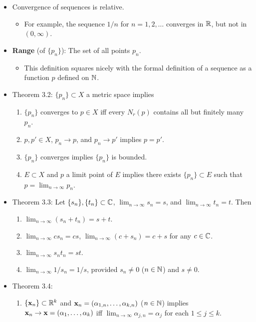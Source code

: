 \documentclass[../../notes.tex]{subfiles}
\begin{document}
\begin{itemize}
    \item {}Convergence of sequences is relative.
    \begin{itemize}
        \item For example, the sequence $1/n$ for $n=1,2,\dots$ converges in $\mathbb{R}$, but not in $(0,\infty)$.
    \end{itemize}
    \item \textbf{Range} (of $\{p_n\}$): The set of all points $p_n$.
    \begin{itemize}
        \item This definition squares nicely with the formal definition of a sequence as a function $p$ defined on $\mathbb{N}$.
    \end{itemize}
    \item Theorem 3.2: $\{p_n\}\subset X$ a metric space implies
    \begin{enumerate}[label={(\alph*)}]
        \item $\{p_n\}$ converges to $p\in X$ iff every $N_r(p)$ contains all but finitely many $p_n$.
        \item $p,p'\in X$, $p_n\to p$, and $p_n\to p'$ implies $p=p'$.
        \item $\{p_n\}$ converges implies $\{p_n\}$ is bounded.
        \item $E\subset X$ and $p$ a limit point of $E$ implies there exists $\{p_n\}\subset E$ such that $p=\lim_{n\to\infty}p_n$.
    \end{enumerate}
    \item Theorem 3.3: Let $\{s_n\},\{t_n\}\subset\mathbb{C}$, $\lim_{n\to\infty}s_n=s$, and $\lim_{n\to\infty}t_n=t$. Then
    \begin{enumerate}[label={(\alph*)}]
        \item $\lim_{n\to\infty}(s_n+t_n)=s+t$.
        \item $\lim_{n\to\infty}cs_n=cs$, $\lim_{n\to\infty}(c+s_n)=c+s$ for any $c\in\mathbb{C}$.
        \item $\lim_{n\to\infty}s_nt_n=st$.
        \item $\lim_{n\to\infty}1/s_n=1/s$, provided $s_n\neq 0$ ($n\in\mathbb{N}$) and $s\neq 0$.
    \end{enumerate}
    \item Theorem 3.4:
    \begin{enumerate}[label={(\alph*)}]
        \item $\{\mathbf{x}_n\}\subset\mathbb{R}^k$ and $\mathbf{x}_n=(\alpha_{1,n},\dots,\alpha_{k,n})$ ($n\in\mathbb{N}$) implies $\mathbf{x}_n\to\mathbf{x}=(\alpha_1,\dots,\alpha_k)$ iff $\lim_{n\to\infty}\alpha_{j,n}=\alpha_j$ for each $1\leq j\leq k$.

\end{enumerate}
\end{itemize}
\end{document}
